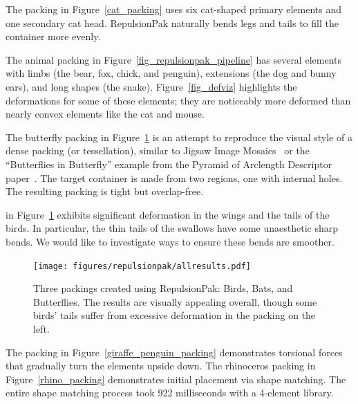 The packing in Figure~\ref{cat_packing} 
uses six cat-shaped primary elements and one secondary cat head.
RepulsionPak naturally bends legs and tails to fill the container more evenly.

The animal packing in Figure~\ref{fig_repulsionpak_pipeline} 
has several elements with limbs (the bear, fox, chick, and penguin),  
extensions (the dog and bunny ears), and long shapes (the snake).
Figure~\ref{fig_defviz} highlights the deformations for some of these elements;
they are noticeably more deformed 
than nearly convex elements like the cat and mouse.


The butterfly packing in Figure~\ref{three_packings} is an attempt to reproduce 
the visual style of a dense packing (or tessellation), similar to Jigsaw Image Mosaics~\cite{Kim2002}
or the ``Butterflies in Butterfly'' example from the
Pyramid of Arclength Descriptor paper~\cite[Figure 21]{Kwan2016}. 
The target container is made from two regions,
one with internal holes.  The resulting packing is tight but overlap-free.

 in Figure~\ref{three_packings}
exhibits significant deformation in the wings and the tails of the birds.
In particular, the thin tails of the swallows have some unaesthetic
sharp bends.  We would like to investigate ways to ensure these bends are
smoother.



\begin{figure}
\centering
\texttt{[image: figures/repulsionpak/allresults.pdf]} 
\caption[Three packings created using RepulsionPak: Birds, Bats, and Butterflies]
{\label{three_packings} Three packings created using RepulsionPak: Birds, Bats, and Butterflies. The results are visually appealing overall, though some birds' tails suffer from excessive deformation in
the packing on the left.}
\end{figure}

The packing in Figure~\ref{giraffe_penguin_packing} demonstrates torsional forces
that gradually turn the elements upside down. 
The rhinoceros packing in Figure~\ref{rhino_packing} demonstrates initial placement via shape matching.
The entire shape matching process took 922 milliseconds with a 4-element library.



